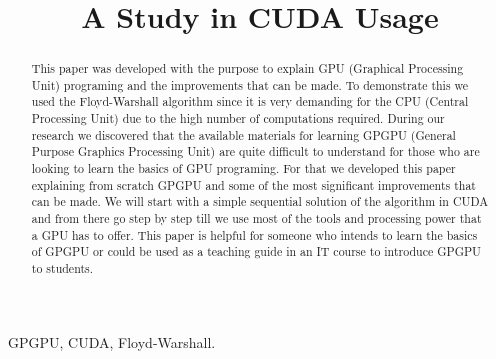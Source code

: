 \documentclass[conference]{IEEEtran}
\begin{document}
\title{A Study in CUDA Usage}


\author{
\and
{}
}

\maketitle

\begin{abstract}
This paper was developed with the purpose to explain GPU (Graphical Processing Unit) programing and the improvements that can be made. To demonstrate this we used the Floyd-Warshall algorithm since it is very demanding for the CPU (Central Processing Unit) due to the high number of computations required. During our research we discovered that the available materials for learning GPGPU (General Purpose Graphics Processing Unit) are quite difficult to understand for those who are looking to learn the basics of GPU programing. For that we developed this paper explaining from scratch GPGPU and some of the most significant improvements that can be made. We will start with a simple sequential solution of the algorithm in CUDA and from there go step by step till we use most of the tools and processing power that a GPU has to offer. This paper is helpful for someone who intends to learn the basics of GPGPU or could be used as a teaching guide in an IT course to introduce GPGPU to students.
\end{abstract}

\begin{IEEEkeywords}
GPGPU, CUDA, Floyd-Warshall.
\end{IEEEkeywords}
\end{document}
